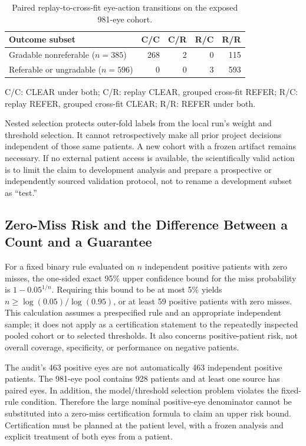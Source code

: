 \documentclass{ieeeaccess}
\begin{document}
\begin{table}[t]
\centering
\caption{Paired replay-to-cross-fit eye-action transitions on the exposed 981-eye cohort.}
\label{tab:paired-transitions}
\small
\begin{tabular}{lrrrr}
\toprule
Outcome subset & C/C & C/R & R/C & R/R \\
\midrule
Gradable nonreferable ($n=385$) & 268 & 2 & 0 & 115 \\
Referable or ungradable ($n=596$) & 0 & 0 & 3 & 593 \\
\bottomrule
\end{tabular}
\vspace{2pt}
\parbox{0.95\columnwidth}{\footnotesize C/C: CLEAR under both; C/R: replay CLEAR, grouped cross-fit REFER; R/C: replay REFER, grouped cross-fit CLEAR; R/R: REFER under both.}
\end{table}

Nested selection protects outer-fold labels from the local run's weight and threshold selection. It cannot retrospectively make all prior project decisions independent of those same patients. A new cohort with a frozen artifact remains necessary. If no external patient access is available, the scientifically valid action is to limit the claim to development analysis and prepare a prospective or independently sourced validation protocol, not to rename a development subset as ``test.''

\subsection{Zero-Miss Risk and the Difference Between a Count and a Guarantee}
For a fixed binary rule evaluated on $n$ independent positive patients with zero misses, the one-sided exact 95\% upper confidence bound for the miss probability is $1-0.05^{1/n}$. Requiring this bound to be at most 5\% yields $n\ge\log(0.05)/\log(0.95)$, or at least 59 positive patients with zero misses. This calculation assumes a prespecified rule and an appropriate independent sample; it does not apply as a certification statement to the repeatedly inspected pooled cohort or to selected thresholds. It also concerns positive-patient risk, not overall coverage, specificity, or performance on negative patients.

The audit's 463 positive eyes are not automatically 463 independent positive patients. The 981-eye pool contains 928 patients and at least one source has paired eyes. In addition, the model/threshold selection problem violates the fixed-rule condition. Therefore the large nominal positive-eye denominator cannot be substituted into a zero-miss certification formula to claim an upper risk bound. Certification must be planned at the patient level, with a frozen analysis and explicit treatment of both eyes from a patient.
\end{document}

